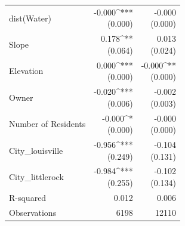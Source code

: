 \begin{table}[h]
\begin{tabular*}{\textwidth}{@{\extracolsep{\fill}}l*{2}{r}}
dist(Water) & \makecell[tr]{-0.000^{***} \\ (0.000)} & \makecell[tr]{-0.000 \\ (0.000)} \\
Slope & \makecell[tr]{0.178^{**} \\ (0.064)} & \makecell[tr]{0.013 \\ (0.024)} \\
Elevation & \makecell[tr]{0.000^{***} \\ (0.000)} & \makecell[tr]{-0.000^{**} \\ (0.000)} \\
Owner & \makecell[tr]{-0.020^{***} \\ (0.006)} & \makecell[tr]{-0.002 \\ (0.003)} \\
Number of Residents & \makecell[tr]{-0.000^{*} \\ (0.000)} & \makecell[tr]{-0.000 \\ (0.000)} \\
City_louisville & \makecell[tr]{-0.956^{***} \\ (0.249)} & \makecell[tr]{-0.104 \\ (0.131)} \\
City_littlerock & \makecell[tr]{-0.984^{***} \\ (0.255)} & \makecell[tr]{-0.102 \\ (0.134)} \\
R-squared & 0.012 & 0.006 \\
Observations & 6198 & 12110 \\
\bottomrule
\end{tabular*}
\end{table}
